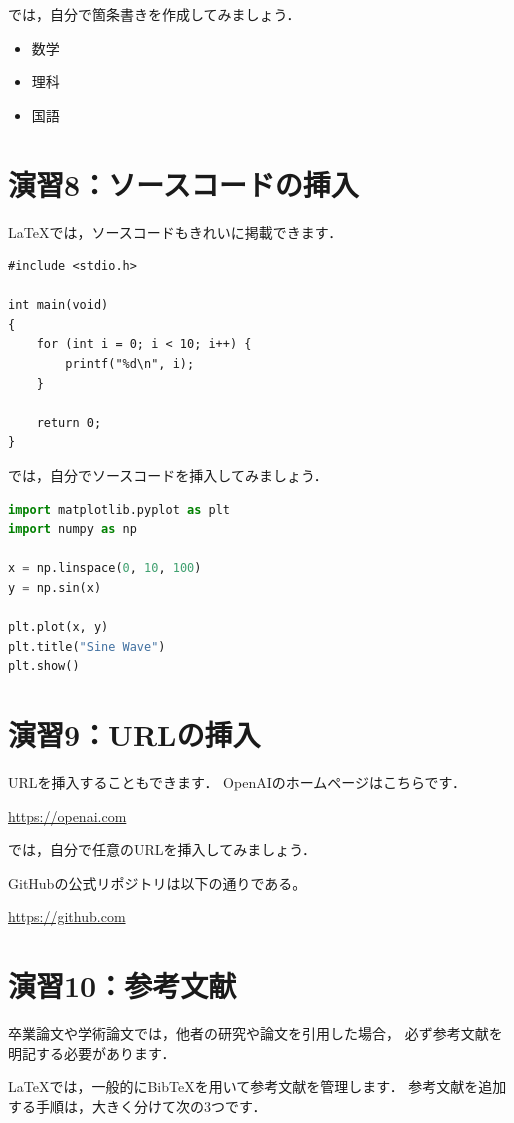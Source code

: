 \documentclass[a4paper,twocolumn]{jsarticle}
\begin{document}
では，自分で箇条書きを作成してみましょう．

\begin{itemize}
    \item 数学
    \item 理科
    \item 国語
\end{itemize}

\section*{演習8：ソースコードの挿入}
LaTeXでは，ソースコードもきれいに掲載できます．

\begin{lstlisting}
#include <stdio.h>

int main(void)
{
    for (int i = 0; i < 10; i++) {
        printf("%d\n", i);
    }

    return 0;
}
\end{lstlisting}

では，自分でソースコードを挿入してみましょう．

\begin{lstlisting}[language=Python]
import matplotlib.pyplot as plt
import numpy as np

x = np.linspace(0, 10, 100)
y = np.sin(x)

plt.plot(x, y)
plt.title("Sine Wave")
plt.show()
\end{lstlisting}

\section*{演習9：URLの挿入}
URLを挿入することもできます．
OpenAIのホームページはこちらです．

\url{https://openai.com}

では，自分で任意のURLを挿入してみましょう．

GitHubの公式リポジトリは以下の通りである。

\url{https://github.com}

\section*{演習10：参考文献}
卒業論文や学術論文では，他者の研究や論文を引用した場合，
必ず参考文献を明記する必要があります．

LaTeXでは，一般的にBibTeXを用いて参考文献を管理します．
参考文献を追加する手順は，大きく分けて次の3つです．
\end{document}

